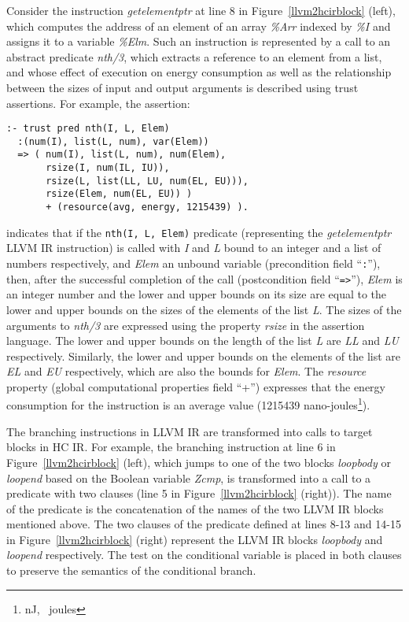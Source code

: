 \documentclass{llncs}
\newcommand{\hcir}{HC IR\xspace}
\newcommand{\llvmir}{LLVM IR\xspace}
\begin{document}
Consider the instruction \textit{getelementptr} at line 8
in Figure~\ref{llvm2hcirblock} (left), which computes 
the address of an element of an array
\textit{\%Arr} indexed by \textit{\%I} and assigns it to a variable
\textit{\%Elm}. 
Such an instruction is represented by a call to an
abstract predicate \textit{nth/3}, which extracts a reference to an
element from a list, and whose effect of execution on energy 
consumption as well as the relationship between the sizes of input and output arguments is described using trust assertions. For example, the assertion:


\begin{lstlisting}[language=ciao, basicstyle=\scriptsize\ttfamily,]
:- trust pred nth(I, L, Elem)
  :(num(I), list(L, num), var(Elem)) 
  => ( num(I), list(L, num), num(Elem), 
       rsize(I, num(IL, IU)), 
       rsize(L, list(LL, LU, num(EL, EU))), 
       rsize(Elem, num(EL, EU)) )
       + (resource(avg, energy, 1215439) ).
\end{lstlisting}

\noindent 
\noindent
indicates that if the \texttt{nth(I, L, Elem)} predicate (representing
the \textit{getelementptr} \llvmir instruction) is called with
\textit{I} and \textit{L} bound to an integer and a list of numbers respectively,
and \textit{Elem} an unbound variable (precondition field
``\texttt{:}''), then, after the successful completion of the call
(postcondition field ``\texttt{=>}''), \textit{Elem} is an integer
number and the lower and upper bounds on its size are equal to the
lower and upper bounds on the sizes of the elements of the list
\textit{L}. The sizes of the arguments to \textit{nth/3} are expressed
using the property \textit{rsize} in the assertion language. The lower
and upper bounds on the length of the list \textit{L} are \textit{LL}
and \textit{LU} respectively. Similarly, the lower and upper bounds on
the elements of the list are \textit{EL} and \textit{EU} respectively,
which are also the bounds for \textit{Elem}. The
\textit{resource} property (global computational properties field “+”)
expresses that the energy consumption for the instruction
is an average value (1215439 nano-joules\footnote{nJ, ~joules}).

The branching instructions in \llvmir{} are transformed into calls to target blocks in \hcir{}. For example, the branching instruction at line 6 in Figure~\ref{llvm2hcirblock} (left),
which jumps to one of the two blocks \textit{loopbody} or
\textit{loopend} based on the Boolean variable \textit{Zcmp}, is
transformed into a call to a predicate with two clauses (line 5 in Figure~\ref{llvm2hcirblock} (right)). The name of
the predicate is the concatenation of the names of the two \llvmir
blocks mentioned above. The two clauses of the predicate defined at lines 8-13 and 14-15 in
Figure~\ref{llvm2hcirblock} (right) represent the \llvmir blocks
\textit{loopbody} and \textit{loopend} respectively. The test on the
conditional variable is placed in both clauses to preserve the 
semantics of the conditional branch.
\end{document}
